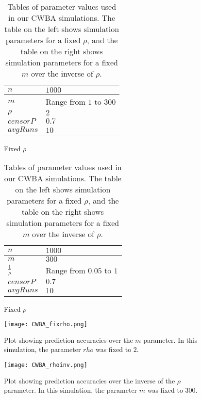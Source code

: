 \begin{table}[h!]
\centering
\begin{subfigure}[h]{0.4\linewidth}
\begin{tabular}{|l|l|}
\hline
$n$ & $1000$ \\ \hline
$m$ & Range from $1$ to $300$\\ \hline
$\rho$ & $2$\\ \hline
$censorP$ & $0.7$\\ \hline
$avgRuns$ & $10$\\ \hline
\end{tabular}
\caption{Fixed $\rho$}
\end{subfigure}
\hfill
\begin{subfigure}[h]{0.4\linewidth}
\begin{tabular}{|l|l|}
\hline
$n$ & $1000$ \\ \hline
$m$ & $300$\\ \hline
$\frac{1}{\rho}$ & Range from $0.05$ to $1$\\ \hline
$censorP$ & $0.7$\\ \hline
$avgRuns$ & $10$\\ \hline
\end{tabular}
\caption{Fixed $\rho$}
\end{subfigure}%
\caption{Tables of parameter values used in our CWBA simulations. The table
on the left shows simulation parameters for a fixed $\rho$, and the table
on the right shows simulation parameters for a fixed $m$ over the inverse of $\rho$.}
\label{table:CWBA-params}
\end{table}

\begin{figure}[h!]
\centering
\texttt{[image: CWBA\_fixrho.png]}
\caption{Plot showing prediction accuracies over the $m$ parameter. In this simulation, the parameter $rho$ was fixed to $2$.}
\label{fig:CWBA_fixrho}
\end{figure}

\begin{figure}[h!]
\centering
\texttt{[image: CWBA\_rhoinv.png]}
\caption{Plot showing prediction accuracies over the inverse of the $\rho$
parameter. In this simulation, the parameter $m$ was fixed to $300$.}
\label{fig:CWBA_rhoinv}
\end{figure}

